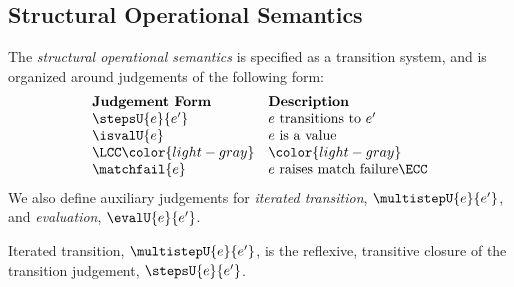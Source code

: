 
\subsection{Structural Operational Semantics}\vspace{-4px}
The \emph{structural operational semantics} is specified as a transition system, and is organized around judgements of the following form:
\vspace{-4px}\[\begin{array}{ll}
\textbf{Judgement Form} & \textbf{Description}\\
\stepsU{e}{e'} & \text{$e$ transitions to $e'$}\\
\isvalU{e} & \text{$e$ is a value}\\
\LCC \color{light-gray} & \color{light-gray} \\
\matchfail{e} & \text{$e$ raises match failure} \ECC
\end{array}\]\vspace{-4px}
We also define auxiliary judgements for \emph{iterated transition}, $\multistepU{e}{e'}$, and \emph{evaluation}, $\evalU{e}{e'}$.


\begin{definition}\label{defn:iterated-transition-UP} Iterated transition, $\multistepU{e}{e'}$, is the reflexive, transitive closure of the transition judgement, $\stepsU{e}{e'}$.\end{definition}


